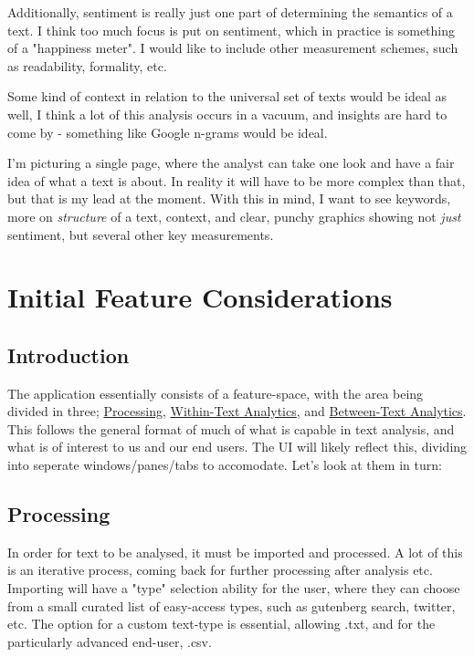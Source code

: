 \documentclass[a4paper, 11pt]{article}
\begin{document}
Additionally, sentiment is really just one part of determining the
semantics of a text. I think too much focus is put on sentiment, which
in practice is something of a "happiness meter". I would like to include
other measurement schemes, such as readability, formality, etc.

Some kind of context in relation to the universal set of texts would be
ideal as well, I think a lot of this analysis occurs in a vacuum, and
insights are hard to come by - something like Google n-grams would be
ideal.

I'm picturing a single page, where the analyst can take one look and
have a fair idea of what a text is about. In reality it will have to be
more complex than that, but that is my lead at the moment. With this in
mind, I want to see keywords, more on \emph{structure} of a text, context,
and clear, punchy graphics showing not \emph{just} sentiment, but several
other key measurements.

\section{Initial Feature Considerations}
\label{sec:org87de7ab}
\subsection{Introduction}
\label{sec:org25205d4}
The application essentially consists of a feature-space, with the area
being divided in three; \hyperref[sec:org1573018]{Processing}, \hyperref[sec:org2ee1584]{Within-Text Analytics}, and
\hyperref[sec:orgf590384]{Between-Text Analytics}. This follows the general format of much of
what is capable in text analysis, and what is of interest to us and our
end users. The UI will likely reflect this, dividing into seperate
windows/panes/tabs to accomodate. Let's look at them in turn:
\subsection{Processing}
\label{sec:org1573018}
In order for text to be analysed, it must be imported and processed. A
lot of this is an iterative process, coming back for further processing
after analysis etc. Importing will have a "type" selection ability for
the user, where they can choose from a small curated list of easy-access
types, such as gutenberg search, twitter, etc. The option for a custom
text-type is essential, allowing .txt, and for the particularly advanced
end-user, .csv.
\end{document}

